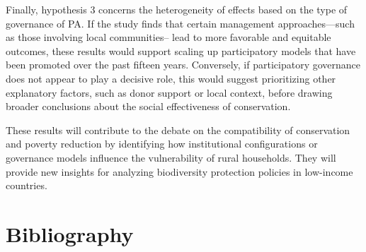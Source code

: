\documentclass[
]{article}
\begin{document}
Finally, hypothesis 3 concerns the heterogeneity of effects based on the
type of governance of PA. If the study finds that certain management
approaches---such as those involving local communities-- lead to more
favorable and equitable outcomes, these results would support scaling up
participatory models that have been promoted over the past fifteen
years. Conversely, if participatory governance does not appear to play a
decisive role, this would suggest prioritizing other explanatory
factors, such as donor support or local context, before drawing broader
conclusions about the social effectiveness of conservation.

These results will contribute to the debate on the compatibility of
conservation and poverty reduction by identifying how institutional
configurations or governance models influence the vulnerability of rural
households. They will provide new insights for analyzing biodiversity
protection policies in low-income countries.

\newpage

\section{Bibliography}\label{bibliography}
\end{document}
